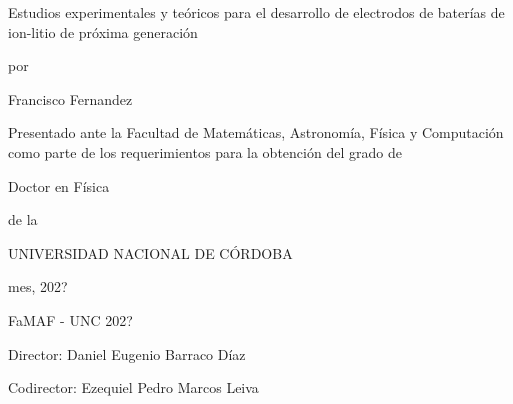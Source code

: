 \documentclass[12pt,spanish,a4paper,twoside]{book}
\newcommand\blankpage{%
    \null
    \thispagestyle{empty}%
    \addtocounter{page}{-1}%
    \newpage
}
\begin{document}
\frontmatter


\thispagestyle{empty}
\begin{center}
{\large

    \vspace{1cm}

    {\Huge Estudios experimentales y teóricos para el desarrollo de electrodos 
    de baterías de ion-litio de próxima generación}
    
    \vspace{0.5cm}
    por
    \vspace{0.5cm}
    
    {\Large Francisco Fernandez}

    \vspace{0.5cm}

    Presentado ante la Facultad de Matemáticas, Astronomía, Física y Computación 
    como parte de los requerimientos para la obtención del grado de
    
    \vspace{0.5cm}

    {\Large Doctor en Física}

    \vspace{0.5cm}
    de la

    UNIVERSIDAD NACIONAL DE CÓRDOBA

    \vspace{0.5cm}
    
    mes, 202?

    \textcopyright FaMAF - UNC 202?

    \vspace{1.5cm}

    Director: Daniel Eugenio Barraco Díaz

    Codirector: Ezequiel Pedro Marcos Leiva

}
\end{center}


\tableofcontents



\mainmatter


%
%
%
%
%
\end{document}
